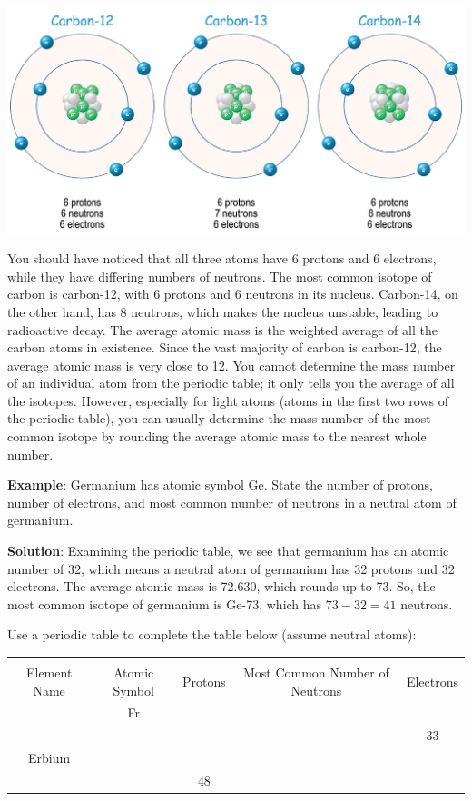 \begin{center}
\includegraphics[scale=0.35]{carbon_iso.png}
\end{center}

You should have noticed that all three atoms have 6 protons and 6 electrons,
while they have differing numbers of neutrons. The most common isotope of carbon
is carbon-12, with 6 protons and 6 neutrons in its nucleus. Carbon-14, on the
other hand, has 8 neutrons, which makes the nucleus unstable, leading to
radioactive decay. The average atomic mass
is the weighted average of all the carbon atoms in existence. Since the vast
majority of carbon is carbon-12, the average atomic mass is very close to 12.
You cannot determine the mass number of an individual atom from the periodic
table; it only tells you the average of all the isotopes. However, especially
for light atoms (atoms in the first two rows of the periodic table), you can
usually determine the mass number of the most common isotope by rounding the
average atomic mass to the nearest whole number.

\textbf{Example}: Germanium has atomic symbol Ge. State the number of protons,
number of electrons, and most common number of neutrons in a neutral atom of
germanium.

\textbf{Solution}: Examining the periodic table, we see that germanium has an
atomic number of 32, which means a neutral atom of germanium has 32 protons and
32 electrons. The average atomic mass is 72.630, which rounds up to 73. So, the
most common isotope of germanium is Ge-73, which has $73 - 32 = 41$ neutrons.

\begin{Exercise}[title = {Determining Numbers of Subatomic Particles}, label = pne]
Use a periodic table to complete the table below (assume neutral atoms): %

\begin{tabular}{|c|c|c|c|c|}
\hline\\
Element Name & Atomic Symbol & Protons & Most Common Number of Neutrons & Electrons\\\hline
 & Fr & & & \\\hline
 & & & & 33\\\hline
 Erbium & & & & \\\hline
  & & 48 & & \\\hline
\end{tabular}
\end{Exercise}

